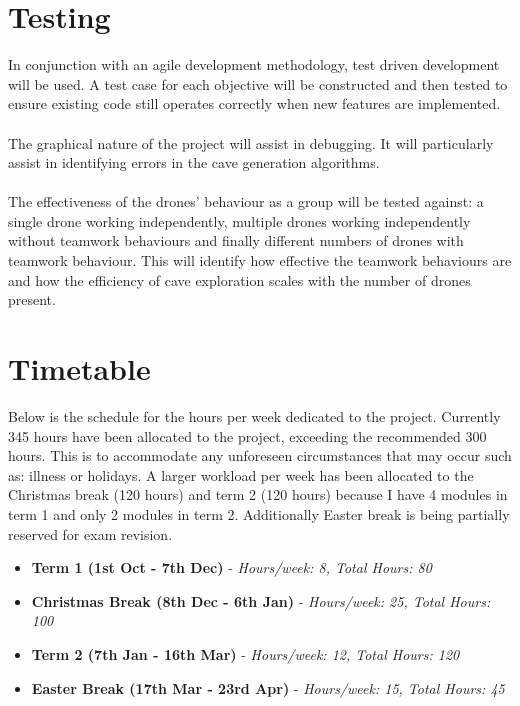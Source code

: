 \documentclass[12pt]{article}
\begin{document}
\pagebreak[4]

\section{Testing}
In conjunction with an agile development methodology, test driven development will be used. A test case for each objective will be constructed and then tested to ensure existing code still operates correctly when new features are implemented.
\\\\
The graphical nature of the project will assist in debugging. It will particularly assist in identifying errors in the cave generation algorithms.
\\\\
The effectiveness of the drones' behaviour as a group will be tested against: a single drone working independently, multiple drones working independently without teamwork behaviours and finally different numbers of drones with teamwork behaviour. This will identify how effective the teamwork behaviours are and how the efficiency of cave exploration scales with the number of drones present.


\section{Timetable}

Below is the schedule for the hours per week dedicated to the project. Currently 345 hours have been allocated to the project, exceeding the recommended 300 hours. This is to accommodate any unforeseen circumstances that may occur such as: illness or holidays. A larger workload per week has been allocated to the Christmas break (120 hours) and term 2 (120 hours) because I have 4 modules in term 1 and only 2 modules in term 2. Additionally Easter break is being partially reserved for exam revision.

% 

\begin{flushleft}

    \begin{itemize}
        \item \textbf{Term 1 (1st Oct - 7th Dec)} - \textit{Hours/week: 8, Total Hours: 80}
        \item \textbf{Christmas Break (8th Dec - 6th Jan)} - \textit{Hours/week: 25, Total Hours: 100}
        \item \textbf{Term 2 (7th Jan - 16th Mar)} - \textit{Hours/week: 12, Total Hours: 120}
        \item \textbf{Easter Break (17th Mar - 23rd Apr)} - \textit{Hours/week: 15, Total Hours: 45}
    \end{itemize}

\end{flushleft}
\end{document}
